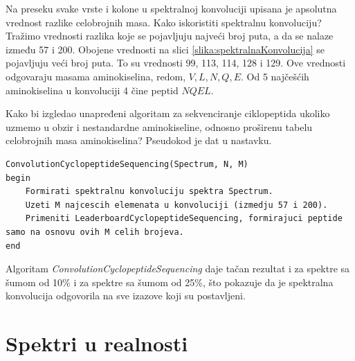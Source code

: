 Na preseku svake vrste i kolone u spektralnoj konvoluciji upisana je apsolutna vrednost razlike celobrojnih masa. Kako iskoristiti spektralnu konvoluciju? Tražimo vrednosti razlika koje se pojavljuju najveći broj puta, a da se nalaze između 57 i 200. Obojene vrednosti na slici \ref{slika:spektralnaKonvolucija} se pojavljuju veći broj puta. To su vrednosti 99, 113, 114, 128 i 129. Ove vrednosti odgovaraju masama aminokiselina, redom, $V, L, N, Q, E $. Od 5 najčešćih aminokiselina u konvoluciji 4 čine peptid $NQEL$.

Kako bi izgledao unapređeni algoritam za sekvenciranje ciklopeptida ukoliko uzmemo u obzir i nestandardne aminokiseline, odnosno proširenu tabelu celobrojnih masa aminokiselina? Pseudokod je dat u nastavku.
\begin{lstlisting}
ConvolutionCyclopeptideSequencing(Spectrum, N, M)
begin
	Formirati spektralnu konvoluciju spektra Spectrum.
	Uzeti M najcescih elemenata u konvoluciji (izmedju 57 i 200).
	Primeniti LeaderboardCyclopeptideSequencing, formirajuci peptide samo na osnovu ovih M celih brojeva.
end
\end{lstlisting}

Algoritam  \textit{ConvolutionCyclopeptideSequencing} daje tačan rezultat i za spektre sa šumom od 10\% i za spektre sa šumom od 25\%, što pokazuje da je spektralna konvolucija odgovorila na sve izazove koji su postavljeni.

\section{Spektri u realnosti} \label{realnost}

